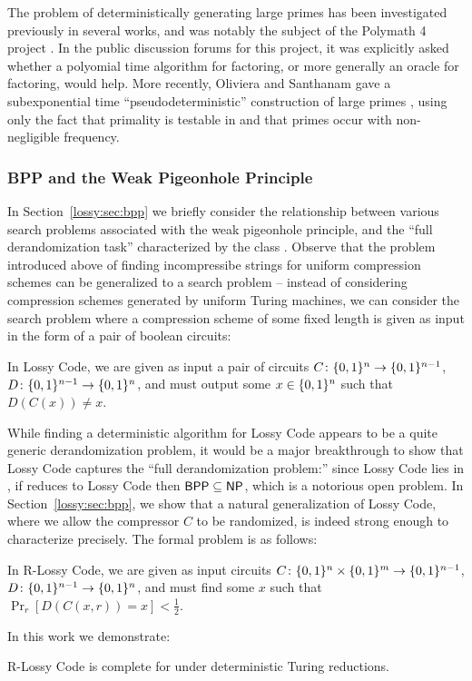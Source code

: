 The problem of deterministically generating large primes has been investigated previously in several works, and was notably the subject of the Polymath 4 project \cite{polymath}. In the public discussion forums for this project, it was explicitly asked whether a polyomial time algorithm for factoring, or more generally an oracle for factoring, would help. More recently, Oliviera and Santhanam gave a subexponential time ``pseudodeterministic'' construction of large primes \cite{pseudo-primes}, using only the fact that primality is testable in  \cite{primes} and that primes occur with non-negligible frequency.

\subsubsection{BPP and the Weak Pigeonhole Principle}
In Section~\ref{lossy:sec:bpp} we briefly consider the relationship between various search problems associated with the weak pigeonhole principle, and the ``full derandomization task'' characterized by the class . Observe that the problem introduced above of finding incompressibe strings for uniform compression schemes can be generalized to a  search problem -- instead of considering compression schemes generated by uniform Turing machines, we can consider the search problem where a compression scheme of some fixed length is given as input in the form of a pair of boolean circuits:
\begin{definition}
In {\sc Lossy Code}, we are given as input a pair of circuits $C\colon \{0,1\}^n \to \{0,1\}^{n-1}$, $D\colon\{0,1\}^{n-1}\to\{0,1\}^n$, and must output some $x \in \{0,1\}^n$ such that $D(C(x))\neq x$.
\end{definition}

While finding a deterministic algorithm for {\sc Lossy Code} appears to be a quite generic derandomization problem, it would be a major breakthrough to show that {\sc Lossy Code} captures the ``full derandomization problem:'' since {\sc Lossy Code} lies in , if  reduces to {\sc Lossy Code} then $\cl{BPP} \subseteq \cl{NP}$, which is a notorious open problem. In Section~\ref{lossy:sec:bpp}, we show that a natural generalization of {\sc Lossy Code}, where we allow the compressor $C$ to be randomized, is indeed strong enough to characterize  precisely. The formal problem is as follows:
\begin{definition}
In {\sc R-Lossy Code}, we are given as input circuits $C\colon \{0,1\}^n \times \{0,1\}^m \to \{0,1\}^{n-1}$, $D\colon \{0,1\}^{n-1}\to\{0,1\}^n$, and must find some $x$ such that $\Pr_r [D(C(x,r))=x] < \frac{1}{2}$. 
\end{definition}
In this work we demonstrate:
\begin{theorem*}
{\sc R-Lossy Code} is complete for  under deterministic Turing reductions.
\end{theorem*}

